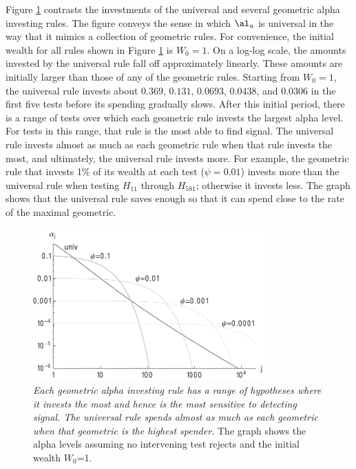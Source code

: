 \documentclass{gSCS2e}
\begin{document}
  
  
 Figure \ref{fig:rules} contrasts the investments of the universal and several geometric
 alpha investing rules.  The figure conveys the sense in which $\al_u$ is universal in the
 way that it mimics a collection of geometric rules.  For convenience, the initial wealth
 for all rules shown in Figure \ref{fig:rules} is $W_0 = 1$.  On a log-log scale, the
 amounts invested by the universal rule fall off approximately linearly.  These amounts
 are initially larger than those of any of the geometric rules.  Starting from $W_0=1$,
 the universal rule invests about $0.369$, $0.131$, $0.0693$, $0.0438$, and $0.0306$ in
 the first five tests before its spending gradually slows.  After this initial period,
 there is a range of tests over which each geometric rule invests the largest alpha level.
  For tests in this range, that rule is the most able to find signal. The universal rule
 invests almost as much as each geometric rule when that rule invests the most, and
 ultimately, the universal rule invests more.  For example, the geometric rule that
 invests 1\% of its wealth at each test ($\psi=0.01$) invests more than the universal rule
 when testing $H_{11}$ through $H_{581}$; otherwise it invests less.  The graph shows that
 the universal rule saves enough so that it can spend close to the rate of the maximal
 geometric.



 \begin{figure}
 \caption{ 
 { \sl Each geometric alpha investing rule has a range of hypotheses where it invests the most and hence is the most sensitive to detecting signal.  The universal rule spends almost as much as each geometric  when that geometric is the highest spender.} The graph shows the alpha levels assuming no intervening test rejects and the initial wealth $W_0$=1. }
 \label{fig:rules}

 \centerline{
 \vspace{0.1in}
 \includegraphics[width=3.5in]{figures/rules} }
 \vspace{0.2in}
 \end{figure}
\end{document}

